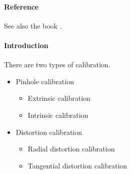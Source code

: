 \documentclass[11pt,a4paper]{article}
\begin{document}
\paragraph{Reference} See also the book \cite[Chapters~6~and~7]{Hartley2003}. 
\paragraph{Introduction}
There are two types of calibration. 
\begin{itemize}
\item Pinhole calibration
\begin{itemize}
\item Extrinsic calibration
\item Intrinsic calibration
\end{itemize}
\item Distortion calibration
\begin{itemize}
\item Radial distortion calibration
\item Tangential distortion calibration
\end{itemize}
\end{itemize}
\end{document}
